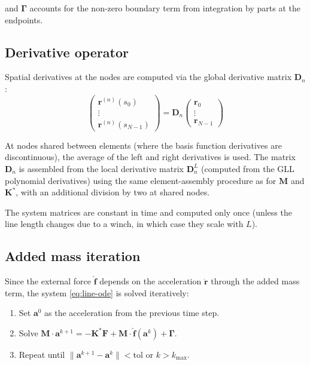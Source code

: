 \documentclass[11pt]{article}
\begin{document}
and $\boldsymbol{\Gamma}$ accounts for the non-zero boundary term from integration by parts at the endpoints.

\subsection{Derivative operator}

Spatial derivatives at the nodes are computed via the global derivative matrix $\mathbf{D}_n$:
\begin{equation}
\begin{pmatrix} \mathbf{r}^{(n)}(s_0) \\ \vdots \\ \mathbf{r}^{(n)}(s_{N-1}) \end{pmatrix} = \mathbf{D}_n\begin{pmatrix} \mathbf{r}_0 \\ \vdots \\ \mathbf{r}_{N-1} \end{pmatrix}
\end{equation}

At nodes shared between elements (where the basis function derivatives are discontinuous), the average of the left and right derivatives is used. The matrix $\mathbf{D}_n$ is assembled from the local derivative matrix $\mathbf{D}_n^L$ (computed from the GLL polynomial derivatives) using the same element-assembly procedure as for $\mathbf{M}$ and $\mathbf{K}^*$, with an additional division by two at shared nodes.

The system matrices are constant in time and computed only once (unless the line length changes due to a winch, in which case they scale with $L$).

\subsection{Added mass iteration}

Since the external force $\hat{\mathbf{f}}$ depends on the acceleration $\ddot{\mathbf{r}}$ through the added mass term, the system \eqref{eq:line-ode} is solved iteratively:
\begin{enumerate}
    \item Set $\mathbf{a}^0$ as the acceleration from the previous time step.
    \item Solve $\mathbf{M}\cdot\mathbf{a}^{k+1} = -\mathbf{K}^*\mathbf{F} + \mathbf{M}\cdot\hat{\mathbf{f}}(\mathbf{a}^k) + \boldsymbol{\Gamma}$.
    \item Repeat until $\|\mathbf{a}^{k+1}-\mathbf{a}^k\| < \text{tol}$ or $k > k_{\max}$.
\end{enumerate}
\end{document}

